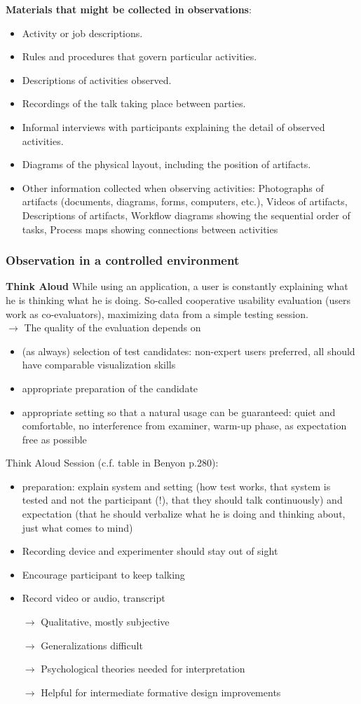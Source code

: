 \textbf{Materials that might be collected in observations}:
\begin{itemize}
\item Activity or job descriptions.
\item Rules and procedures that govern particular activities.
\item Descriptions of activities observed.
\item Recordings of the talk taking place between parties.
\item Informal interviews with participants explaining the detail of observed activities.
\item Diagrams of the physical layout, including the position of artifacts.
\item Other information collected when observing activities: Photographs of artifacts (documents, diagrams, forms, computers, etc.), Videos of artifacts, Descriptions of artifacts, Workflow diagrams showing the sequential order of tasks, Process maps showing connections between activities
\end{itemize}
\subsubsection{Observation in a controlled environment}
\textbf{Think Aloud}
While using an application, a user is constantly explaining what he is thinking what he is doing. So-called cooperative usability evaluation (users work as co-evaluators), maximizing data from a simple testing session.\\
$\rightarrow$ The quality of the evaluation depends on 
\begin{itemize}
\item (as always) selection of test candidates: non-expert users preferred, all should have comparable visualization skills
\item appropriate preparation of the candidate
\item appropriate setting so that a natural usage can be guaranteed: quiet and comfortable, no interference from examiner, warm-up phase, as expectation free as possible
\end{itemize}
Think Aloud Session (c.f. table in Benyon p.280):
\begin{itemize}
\item preparation: explain system and setting (how test works, that system is tested and not the participant (!), that they should talk continuously) and expectation (that he should verbalize what he is doing and thinking about, just what comes to mind)
\item Recording device and experimenter should stay out of sight
\item Encourage participant to keep talking
\item Record video or audio, transcript
\item[$\rightarrow$] Qualitative, mostly subjective
\item[$\rightarrow$] Generalizations difficult
\item[$\rightarrow$] Psychological theories needed for interpretation
\item[$\rightarrow$] Helpful for intermediate formative design improvements
\end{itemize}

